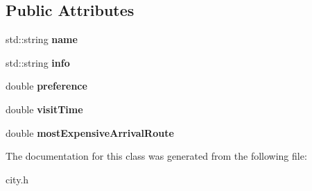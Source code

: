 \subsection*{Public Attributes}
\begin{DoxyCompactItemize}
\item 
\hypertarget{class_city_afea8cd8800a8600fa54af37ac05bf177}{}std\+::string {\bfseries name}\label{class_city_afea8cd8800a8600fa54af37ac05bf177}

\item 
\hypertarget{class_city_a696817be4a02af25c9f05d16fc4f0646}{}std\+::string {\bfseries info}\label{class_city_a696817be4a02af25c9f05d16fc4f0646}

\item 
\hypertarget{class_city_a6077fb7eaa08209925af83a02c3a1c04}{}double {\bfseries preference}\label{class_city_a6077fb7eaa08209925af83a02c3a1c04}

\item 
\hypertarget{class_city_a9d651fe0145698c6210c40548e3e3977}{}double {\bfseries visit\+Time}\label{class_city_a9d651fe0145698c6210c40548e3e3977}

\item 
\hypertarget{class_city_a6373b5eb497338a81e5ffb377cacbf50}{}double {\bfseries most\+Expensive\+Arrival\+Route}\label{class_city_a6373b5eb497338a81e5ffb377cacbf50}

\end{DoxyCompactItemize}


The documentation for this class was generated from the following file\+:\begin{DoxyCompactItemize}
\item 
city.\+h\end{DoxyCompactItemize}
